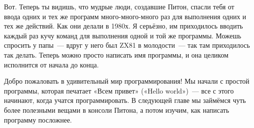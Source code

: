 Вот. Теперь ты видишь, что мудрые люди, создавшие Питон, спасли тебя от ввода одних и тех же программ много-много-много раз для выполнения одних и тех же действий. Как они делали в 1980х. Я серьёзно, им приходилось вводить каждый раз кучу команд для выполнения одной и той же программы. Можешь спросить у папы — вдруг у него был ZX81 в молодости — так там приходилось так делать. Теперь можно просто написать имя программы, и она целиком исполнится от начала до конца.


Добро пожаловать в удивительный мир программирования!
Мы начали с простой программы, которая печатает «Всем привет» («Hello world») — все с этого начинают, когда учатся программировать. В следующей главе мы займёмся чуть более полезными вещами в консоли Питона, а потом изучим, как написать программу посложнее.
